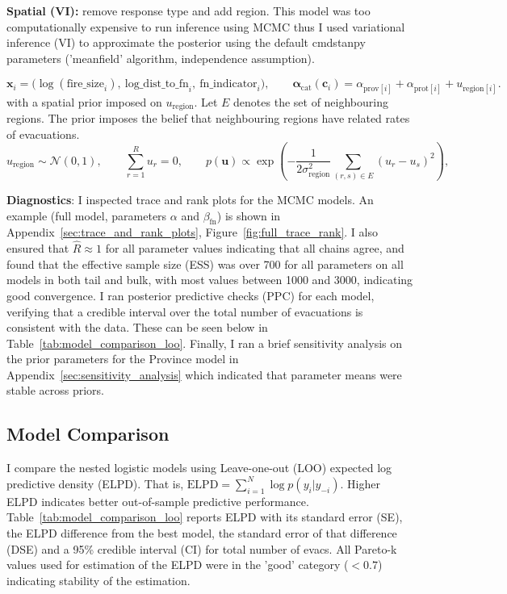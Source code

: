 \textbf{Spatial (VI):} remove response type and add region. This model was too computationally expensive to run inference using MCMC thus I used variational inference (VI) to approximate the posterior using the default cmdstanpy parameters ('meanfield' algorithm, independence assumption).

\[
\mathbf{x}_i = \big(\log(\text{fire\_size}_i),\ \text{log\_dist\_to\_fn}_i,\ \text{fn\_indicator}_i\big),
\qquad
\mathbf{\alpha}_{\mathrm{cat}}(\mathbf{c}_i)
=
\alpha_{\mathrm{prov}[i]} + \alpha_{\mathrm{prot}[i]} + u_{\mathrm{region}[i]}.
\]
with a spatial prior imposed on \(u_{\mathrm{region}}\). Let $E$ denotes the set of neighbouring regions. The prior imposes the belief that neighbouring regions have related rates of evacuations.
\[
u_{\mathrm{region}} \sim \mathcal{N}(0,1), \qquad
\sum_{r=1}^R u_r = 0, \qquad
p(\mathbf{u}) \propto
\exp\left(
-\frac{1}{2\sigma_{\mathrm{region}}^2}
\sum_{(r,s)\in E} (u_r - u_s)^2
\right),
\]

\textbf{Diagnostics}: I inspected trace and rank plots for the MCMC models. An example (full model, parameters $\alpha$ and $\beta_{\mathrm{fn}}$) is shown in Appendix~\ref{sec:trace_and_rank_plots}, Figure~\ref{fig:full_trace_rank}. I also ensured that $\hat{R}\approx 1$ for all parameter values indicating that all chains agree, and found that the effective sample size (ESS) was over 700 for all parameters on all models in both tail and bulk, with most values between 1000 and 3000, indicating good convergence. I ran posterior predictive checks (PPC) for each model, verifying that a credible interval over the total number of evacuations is consistent with the data. These can be seen below in Table~\ref{tab:model_comparison_loo}. Finally, I ran a brief sensitivity analysis on the prior parameters for the Province model in Appendix~\ref{sec:sensitivity_analysis} which indicated that parameter means were stable across priors.

\subsection{Model Comparison}\label{sec:model_comparison}
I compare the nested logistic models using Leave-one-out (LOO) expected log predictive density (ELPD). That is, $\text{ELPD} = \sum_{i=1}^{N} \log p(y_i | y_{-i})$. Higher ELPD indicates better out-of-sample predictive performance. Table~\ref{tab:model_comparison_loo} reports ELPD with its standard error (SE), the ELPD difference from the best model, the standard error of that difference (DSE) and a 95\% credible interval (CI) for total number of evacs. All Pareto-k values used for estimation of the ELPD were in the 'good' category ($<0.7$) indicating stability of the estimation.

